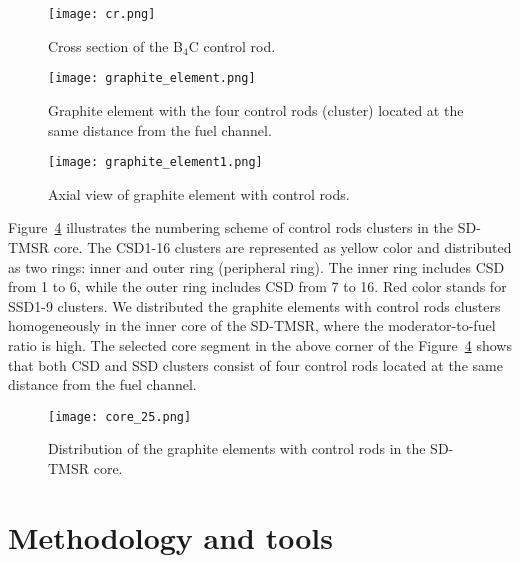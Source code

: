 \begin{figure}[t!]  %
	\centering
	\hspace{+0.65in} 
	\texttt{[image: cr.png]}
	\caption{Cross section of the B$_4$C control rod.}
	\label{fig:cr}
\end{figure}

\begin{figure}[t!]  %
	\centering
	\hspace{+0.65in}
	\texttt{[image: graphite\_element.png]}
	\caption{Graphite element with the four control rods (cluster) located at the same distance from the fuel channel.}
	\label{fig:graphite_elemen}
\end{figure}

\begin{figure}[t!]  %
	\centering
	\hspace{+0.65in}
	\texttt{[image: graphite\_element1.png]}
	\caption{Axial view of graphite element with control rods.}
	\label{fig:graphite_elemen1}
\end{figure}

Figure~\ref{fig:core_25} illustrates the numbering scheme of control rods clusters in the SD-TMSR core.
The CSD1-16 clusters are represented as yellow color and distributed as two rings: inner and outer ring (peripheral ring). The inner ring includes CSD from 1 to 6, while the outer ring includes CSD from 7 to 16. Red color stands for SSD1-9 clusters.
We distributed the graphite elements with control rods clusters homogeneously in the inner core of the SD-TMSR, where the moderator-to-fuel ratio is high.
The selected core segment in the above corner of the Figure~\ref{fig:core_25} shows that both CSD and SSD clusters consist of four control rods located at the same distance from the fuel channel.

\begin{figure}[t!]  %
	\centering
	\hspace{+0.65in}
	\texttt{[image: core\_25.png]}
	\caption{Distribution of the graphite elements with control rods in the SD-TMSR core.}
	\label{fig:core_25}
\end{figure}


\section{Methodology and tools} \label{Methodology-and-tools}
